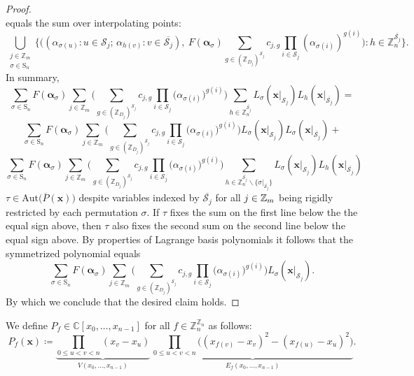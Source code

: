 \begin{proof}
\[\]
equals the sum over interpolating points:
\[
\bigcup_{\begin{array}{c}
j\in\mathbb{Z}_{m}\\
\sigma\in\text{S}_{n}
\end{array}}\bigg\{\bigg((\alpha_{\sigma(u)}:u\in\mathscr{S}_{j};\,\alpha_{h(v)}:v\in\overline{\mathscr{S}_{j}}),\:F(\boldsymbol{\alpha}_{\sigma})\sum_{g\in(\mathbb{Z}_{D_{j}})^{\mathscr{S}_{j}}}c_{j,g}\prod_{i\in\mathscr{S}_{j}}(\alpha_{\sigma(i)})^{g(i)}\bigg):h\in\mathbb{Z}_{n}^{\overline{\mathscr{S}_{j}}}\bigg\}.
\]
 In summary,
 \[
\sum_{\sigma\in\text{S}_{n}}F(\boldsymbol{\alpha}_{\sigma})\sum_{j\in\mathbb{Z}_{m}}\bigg(\sum_{g\in(\mathbb{Z}_{D_{j}})^{\mathscr{S}_{j}}}c_{j,g}\prod_{i\in\mathscr{S}_{j}}\big(\alpha_{\sigma(i)}\big)^{g(i)}\bigg)\sum_{h\in\mathbb{Z}_{n}^{\overline{\mathscr{S}_{j}}}}L_{\sigma}(\mathbf{x}|_{\mathscr{S}_{j}})L_{h}(\mathbf{x}|_{\overline{\mathscr{S}_{j}}})=
 \]
 \[
\sum_{\sigma\in\text{S}_{n}}F(\boldsymbol{\alpha}_{\sigma})\sum_{j\in\mathbb{Z}_{m}}\bigg(\sum_{g\in(\mathbb{Z}_{D_{j}})^{\mathscr{S}_{j}}}c_{j,g}\prod_{i\in\mathscr{S}_{j}}\big(\alpha_{\sigma(i)}\big)^{g(i)}\bigg)L_{\sigma}(\mathbf{x}|_{\mathscr{S}_{j}})L_{\sigma}(\mathbf{x}|_{\overline{\mathscr{S}_{j}}})+
 \]
 \[
\sum_{\sigma\in\text{S}_{n}}F(\boldsymbol{\alpha}_{\sigma})\sum_{j\in\mathbb{Z}_{m}}\bigg(\sum_{g\in(\mathbb{Z}_{D_{j}})^{\mathscr{S}_{j}}}c_{j,g}\prod_{i\in\mathscr{S}_{j}}\big(\alpha_{\sigma(i)}\big)^{g(i)}\bigg)\sum_{h\in\mathbb{Z}_{n}^{\overline{\mathscr{S}_{j}}}\backslash\{\sigma|_{\overline{\mathscr{S}_{j}}}\}}L_{\sigma}(\mathbf{x}|_{\mathscr{S}_{j}})L_{h}(\mathbf{x}|_{\overline{\mathscr{S}_{j}}})
 \]
$\tau \in \textrm{Aut}\big(\overline{P}(\mathbf{x})\big)$  despite variables indexed by $\overline{\mathscr{S}_{j}}$ for all $j\in {\mathbb Z}_m$ being rigidly restricted by each permutation $\sigma$. If $\tau$ fixes the sum on the first line below the the equal sign above, then $\tau$ also fixes the second sum on the second line below the equal sign above. By properties of Lagrange basis polynomials it follows that the symmetrized polynomial equals
\[
\sum_{\sigma\in\text{S}_{n}}F(\boldsymbol{\alpha}_{\sigma})\sum_{j\in\mathbb{Z}_{m}}\bigg(\sum_{g\in(\mathbb{Z}_{D_{j}})^{\mathscr{S}_{j}}}c_{j,g}\prod_{i\in\mathscr{S}_{j}}\big(\alpha_{\sigma(i)}\big)^{g(i)}\bigg)L_{\sigma}(\mathbf{x}|_{\mathscr{S}_{j}}).
\]
By which we conclude that the desired claim holds.
\end{proof}
\begin{defn}\label{defn:polynomial-grace-definition} We define $P_f \in \mathbb{C}[x_0, \ldots, x_{n-1}]$ for all $f \in \mathbb{Z}_n^{\mathbb{Z}_n}$ as follows:
\begin{equation}
    P_f(\mathbf{x}) \coloneq \underbrace{\prod_{0\le u<v<n}(x_{v}-x_{u})}_{V(x_0,\ldots,x_{n-1})}\,\underbrace{\prod_{0\le u<v<n}\big((x_{f(v)}-x_{v})^{2}-(x_{f(u)}-x_{u})^{2}\big)}_{E_f(x_0,\ldots,x_{n-1})}.
\end{equation}
\end{defn}
